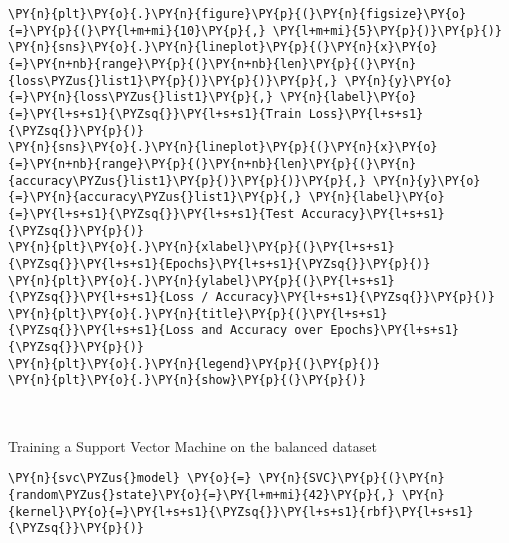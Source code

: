     \begin{tcolorbox}[breakable, size=fbox, boxrule=1pt, pad at break*=1mm,colback=cellbackground, colframe=cellborder]
\begin{Verbatim}[commandchars=\\\{\}]
\PY{n}{plt}\PY{o}{.}\PY{n}{figure}\PY{p}{(}\PY{n}{figsize}\PY{o}{=}\PY{p}{(}\PY{l+m+mi}{10}\PY{p}{,} \PY{l+m+mi}{5}\PY{p}{)}\PY{p}{)}
\PY{n}{sns}\PY{o}{.}\PY{n}{lineplot}\PY{p}{(}\PY{n}{x}\PY{o}{=}\PY{n+nb}{range}\PY{p}{(}\PY{n+nb}{len}\PY{p}{(}\PY{n}{loss\PYZus{}list1}\PY{p}{)}\PY{p}{)}\PY{p}{,} \PY{n}{y}\PY{o}{=}\PY{n}{loss\PYZus{}list1}\PY{p}{,} \PY{n}{label}\PY{o}{=}\PY{l+s+s1}{\PYZsq{}}\PY{l+s+s1}{Train Loss}\PY{l+s+s1}{\PYZsq{}}\PY{p}{)}
\PY{n}{sns}\PY{o}{.}\PY{n}{lineplot}\PY{p}{(}\PY{n}{x}\PY{o}{=}\PY{n+nb}{range}\PY{p}{(}\PY{n+nb}{len}\PY{p}{(}\PY{n}{accuracy\PYZus{}list1}\PY{p}{)}\PY{p}{)}\PY{p}{,} \PY{n}{y}\PY{o}{=}\PY{n}{accuracy\PYZus{}list1}\PY{p}{,} \PY{n}{label}\PY{o}{=}\PY{l+s+s1}{\PYZsq{}}\PY{l+s+s1}{Test Accuracy}\PY{l+s+s1}{\PYZsq{}}\PY{p}{)}
\PY{n}{plt}\PY{o}{.}\PY{n}{xlabel}\PY{p}{(}\PY{l+s+s1}{\PYZsq{}}\PY{l+s+s1}{Epochs}\PY{l+s+s1}{\PYZsq{}}\PY{p}{)}
\PY{n}{plt}\PY{o}{.}\PY{n}{ylabel}\PY{p}{(}\PY{l+s+s1}{\PYZsq{}}\PY{l+s+s1}{Loss / Accuracy}\PY{l+s+s1}{\PYZsq{}}\PY{p}{)}
\PY{n}{plt}\PY{o}{.}\PY{n}{title}\PY{p}{(}\PY{l+s+s1}{\PYZsq{}}\PY{l+s+s1}{Loss and Accuracy over Epochs}\PY{l+s+s1}{\PYZsq{}}\PY{p}{)}
\PY{n}{plt}\PY{o}{.}\PY{n}{legend}\PY{p}{(}\PY{p}{)}
\PY{n}{plt}\PY{o}{.}\PY{n}{show}\PY{p}{(}\PY{p}{)}
\end{Verbatim}
\end{tcolorbox}

    \begin{center}
    \end{center}
    { \hspace*{\fill} \\}
    
    Training a Support Vector Machine on the balanced dataset

    \begin{tcolorbox}[breakable, size=fbox, boxrule=1pt, pad at break*=1mm,colback=cellbackground, colframe=cellborder]
\begin{Verbatim}[commandchars=\\\{\}]
\PY{n}{svc\PYZus{}model} \PY{o}{=} \PY{n}{SVC}\PY{p}{(}\PY{n}{random\PYZus{}state}\PY{o}{=}\PY{l+m+mi}{42}\PY{p}{,} \PY{n}{kernel}\PY{o}{=}\PY{l+s+s1}{\PYZsq{}}\PY{l+s+s1}{rbf}\PY{l+s+s1}{\PYZsq{}}\PY{p}{)}
\end{Verbatim}
\end{tcolorbox}

